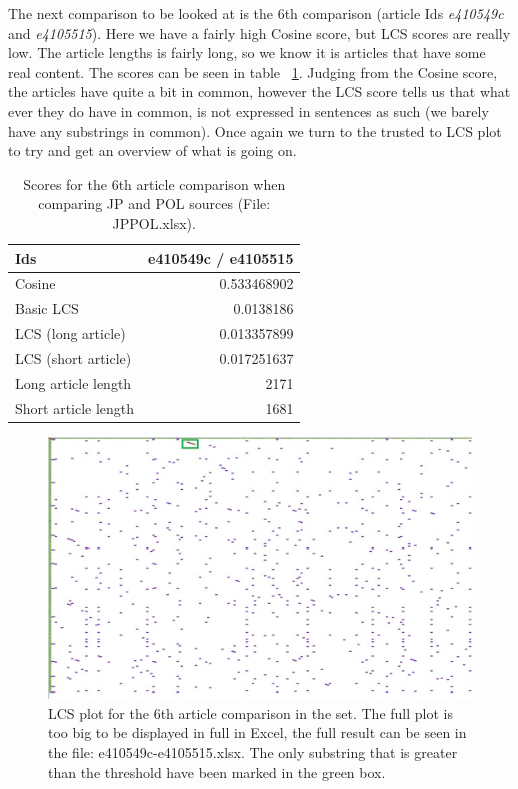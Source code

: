 The next comparison to be looked at is the 6th comparison (article Ids \textit{e410549c} and \textit{e4105515}). Here we have a fairly high Cosine score, but LCS scores are really low. The article lengths is fairly long, so we know it is articles that have some real content. The scores can be seen in table ~\ref{JPPOLSameContent}. Judging from the Cosine score, the articles have quite a bit in common, however the LCS score tells us that what ever they do have in common, is not expressed in sentences as such (we barely have any substrings in common). Once again we turn to the trusted to LCS plot to try and get an overview of what is going on.

\begin{table}
\begin{center}
	\begin{tabular}{l | r}
	Ids & e410549c / e4105515\\ \hline
	Cosine & 0.533468902\\ \hline
	Basic LCS & 0.0138186\\ \hline
	LCS (long article) & 0.013357899\\ \hline
	LCS (short article) & 0.017251637\\ \hline
	Long article length & 2171\\ \hline
	Short article length & 1681\\ \hline	
	\end{tabular}
\end{center}
\caption{Scores for the 6th article comparison when comparing JP and POL sources (File: JPPOL.xlsx).}
\label{JPPOLSameContent}
\end{table}

\begin{figure}
	\centering
	\includegraphics[scale=0.3]{figures/e410549c}
	\caption{LCS plot for the 6th article comparison in the set. The full plot is too big to be displayed in full in Excel, the full result can be seen in the file: e410549c-e4105515.xlsx. The only substring that is greater than the threshold have been marked in the green box.}
	\label{SameContent}
\end{figure}

